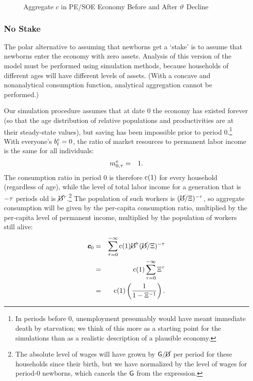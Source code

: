 \documentclass{handout}
\begin{document}
\begin{figure}
\caption{Aggregate $c$ in PE/SOE Economy Before and After $\vartheta$ Decline}
\label{fig:SOEStakescPathAfterThetaDropPlot}
\end{figure}

\subsubsection{No Stake}

The polar alternative to assuming that newborns get a `stake' is to
assume that newborns enter the economy with zero assets.  Analysis of
this version of the model must be performed using simulation methods,
because households of different ages will have different levels of
assets.  (With a concave and nonanalytical consumption function,
analytical aggregation cannot be performed.)

Our simulation procedure assumes that at date 0 the economy has existed forever (so 
that the age distribution of relative populations and productivities are at their steady-state values), but saving has been impossible prior to
period 0.\footnote{In periods before 0, unemployment presumably would have 
meant immediate death by starvation; we think of this more as a starting point
for the simulations than as a realistic description of a plausible economy.}
With everyone's $b^{e}_{t}=0$, the ratio of market resources to permanent
labor income is the same for all individuals:
\begin{eqnarray}
  m^{e}_{0,\tau} & = & 1
.
\end{eqnarray}
The consumption ratio in period 0 is therefore $\mathrm{c}(1)$ for every
household (regardless of age), while the
level of total labor income for a generation that is $-\tau$ periods old is $\cancel{\mho}^{\tau}$.\footnote{The absolute level of wages will have
grown by $\mathsf{G}/\cancel{\mho}$ per period for these households since their birth, but we have normalized by the level of wages
for period-0 newborns, which cancels the $\mathsf{G}$ from the expression.}  The population of
such workers is $(\cancel{\mho}/\Xi)^{-\tau}$, so aggregate consumption will
be given by the per-capita consumption ratio, multiplied by the
per-capita level of permanent income, multiplied by the population of
workers still alive:
\begin{eqnarray}
  \pmb{c}_{0} & = & \sum_{\tau=0}^{-\infty} \mathrm{c}(1) \cancel{\mho}^{\tau} (\cancel{\mho}/\Xi)^{-\tau}
\\ & = & \mathrm{c}(1) \sum_{\tau=0}^{-\infty}  \Xi^{\tau}
\\ & = & \mathrm{c}(1) \left(\frac{1}{1-\Xi^{-1}}\right)
.
\end{eqnarray}
\end{document}
